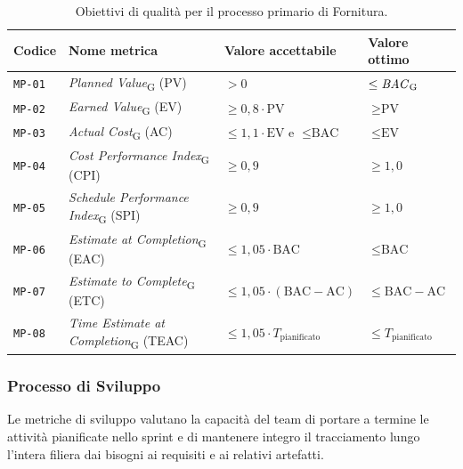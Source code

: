 \documentclass[11pt, a4paper]{article}
\newcommand{\glossario}[1]{\textit{#1}\textsubscript{G}}
\newcommand{\req}[1]{\texttt{#1}}
\begin{document}
\begin{table}[htbp]
    \centering
    \renewcommand{\arraystretch}{1.3}
    \begin{tabularx}{\textwidth}{|P{1.8cm}|X|P{3.8cm}|P{3.4cm}|}
        \hline
        \textbf{\textcolor{primaryColor}{Codice}} & \textbf{\textcolor{primaryColor}{Nome metrica}} & \textbf{\textcolor{primaryColor}{Valore accettabile}} & \textbf{\textcolor{primaryColor}{Valore ottimo}} \\ \hline
        \req{MP-01} & \glossario{Planned Value} (PV) & $> 0$ & $\le \text{\glossario{BAC}}$ \\ \hline
        \req{MP-02} & \glossario{Earned Value} (EV) & $\ge 0{,}8 \cdot \text{PV}$ & $\ge \text{PV}$ \\ \hline
        \req{MP-03} & \glossario{Actual Cost} (AC) & $\le 1{,}1 \cdot \text{EV}$ e $\le \text{BAC}$ & $\le \text{EV}$ \\ \hline
        \req{MP-04} & \glossario{Cost Performance Index} (CPI) & $\ge 0{,}9$ & $\ge 1{,}0$ \\ \hline
        \req{MP-05} & \glossario{Schedule Performance Index} (SPI) & $\ge 0{,}9$ & $\ge 1{,}0$ \\ \hline
        \req{MP-06} & \glossario{Estimate at Completion} (EAC) & $\le 1{,}05 \cdot \text{BAC}$ & $\le \text{BAC}$ \\ \hline
        \req{MP-07} & \glossario{Estimate to Complete} (ETC) & $\le 1{,}05 \cdot (\text{BAC} - \text{AC})$ & $\le \text{BAC} - \text{AC}$ \\ \hline
        \req{MP-08} & \glossario{Time Estimate at Completion} (TEAC) & $\le 1{,}05 \cdot T_{\text{pianificato}}$ & $\le T_{\text{pianificato}}$ \\ \hline
    \end{tabularx}
    \caption{Obiettivi di qualità per il processo primario di Fornitura.}
    \label{tab:proc-fornitura}
\end{table}

\subsubsection{Processo di Sviluppo}
Le metriche di sviluppo valutano la capacità del team di portare a termine le attività pianificate nello sprint e di mantenere integro il tracciamento lungo l'intera filiera dai bisogni ai requisiti e ai relativi artefatti.
\end{document}
